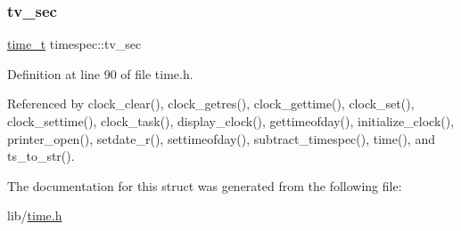 \mbox{\label{structtimespec_afc3302668d7cb5952f590da69fdd4955}} 
\subsubsection{\texorpdfstring{tv\+\_\+sec}{tv\_sec}}
{\footnotesize\ttfamily \hyperlink{time_8h_a3346b04b0420b32ccf6b706551b70762}{time\+\_\+t} timespec\+::tv\+\_\+sec}



Definition at line 90 of file time.\+h.



Referenced by clock\+\_\+clear(), clock\+\_\+getres(), clock\+\_\+gettime(), clock\+\_\+set(), clock\+\_\+settime(), clock\+\_\+task(), display\+\_\+clock(), gettimeofday(), initialize\+\_\+clock(), printer\+\_\+open(), setdate\+\_\+r(), settimeofday(), subtract\+\_\+timespec(), time(), and ts\+\_\+to\+\_\+str().



The documentation for this struct was generated from the following file\+:\begin{DoxyCompactItemize}
\item 
lib/\hyperlink{time_8h}{time.\+h}\end{DoxyCompactItemize}
